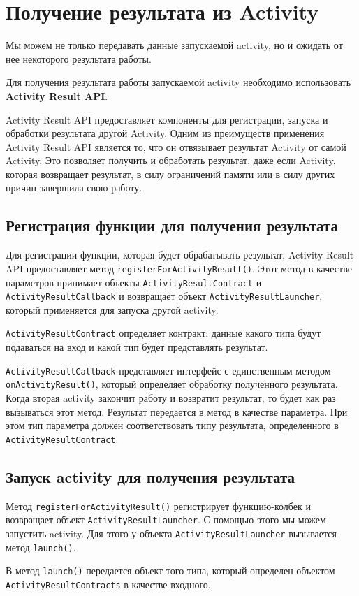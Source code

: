 \section{Получение результата из Activity}
Мы можем не только передавать данные запускаемой activity, но и ожидать
от нее некоторого результата работы.\par
Для получения результата работы запускаемой activity
необходимо использовать \textbf{Activity Result API}.\par
Activity Result API предоставляет компоненты для регистрации, запуска и
обработки результата другой Activity. Одним из преимуществ применения
Activity Result API является то, что он отвязывает результат Activity от самой
Activity. Это позволяет получить и обработать результат, даже если Activity,
которая возвращает результат, в силу ограничений памяти или в силу других
причин завершила свою работу.\par

\subsection{Регистрация функции для получения результата}
Для регистрации функции, которая будет обрабатывать результат, Activity
Result API предоставляет метод \texttt{registerForActivityResult()}.
Этот метод в качестве параметров принимает объекты
\texttt{ActivityResultContract} и \texttt{ActivityResultCallback}
и возвращает объект \texttt{ActivityResultLauncher},
который применяется для запуска другой activity.\par
\texttt{ActivityResultContract} определяет контракт: данные какого типа будут
подаваться на вход и какой тип будет представлять результат.\par
\texttt{ActivityResultCallback} представляет интерфейс с единственным методом
\texttt{onActivityResult()}, который определяет обработку полученного
результата. Когда вторая activity закончит работу и возвратит результат,
то будет как раз вызываться этот метод.
Результат передается в метод в качестве параметра.
При этом тип параметра должен соответствовать типу результата,
определенного в \texttt{ActivityResultContract}.

\subsection{Запуск activity для получения результата}
Метод \texttt{registerForActivityResult()} регистрирует функцию-колбек
и возвращает объект \texttt{ActivityResultLauncher}.
С помощью этого мы можем запустить activity.
Для этого у объекта \texttt{ActivityResultLauncher} вызывается метод
\texttt{launch()}.\par
В метод \texttt{launch()} передается объект того типа, который определен
объектом \texttt{ActivityResultContracts} в качестве входного.


